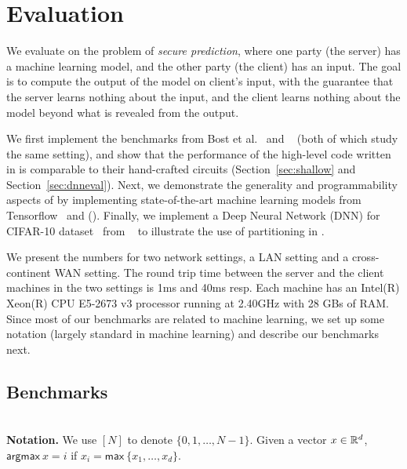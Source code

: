 \section{Evaluation}
\label{sec:eval}
We evaluate \tool on the problem of {\it secure prediction}, where one
party (the server) has a machine learning model, and the other party
(the client) has an input. The goal is to compute the output of the
model on client's input, with the guarantee that the server
learns nothing about the input, and the client learns nothing
about the model beyond what is revealed from the output.

We first implement the benchmarks from Bost et al.~\cite{shafindss}
and \minion~\cite{minionn} (both of which study the same setting),
and show that the performance of the high-level code written in \tool
is comparable to their hand-crafted circuits
(Section~\ref{sec:shallow} and Section~\ref{sec:dnneval}).
%
Next, we demonstrate the generality and programmability aspects of
\tool by implementing state-of-the-art machine learning models from
Tensorflow~\cite{tensorflow} and \bonsai ().
%
Finally, we
implement a Deep Neural Network (DNN) for CIFAR-10
dataset~\cite{cifar} from \minion~\cite{minionn} to illustrate the use
of partitioning in \tool.

We present the numbers for two network settings, a LAN setting and
a cross-continent WAN setting. The round trip time between the server
and the client machines in the two settings is 1ms and 40ms resp. Each
machine has an Intel(R) Xeon(R) CPU E5-2673 v3 processor running at
2.40GHz with 28 GBs of RAM.
%
Since most of our benchmarks
are related to machine learning, we set up some notation (largely
standard in machine learning) and describe our benchmarks next.

\subsection{Benchmarks}
 \\

\noindent\textbf{Notation.} We use $[N]$ to denote $\{0,1,\dotsc, N-1\}$. 
Given a vector $x\in{\mathbb{R}}^d$, $\mathsf{argmax}\ x = i$ if $x_i =
\mathsf{max}\ \{x_1,\ldots,x_d\}$.

